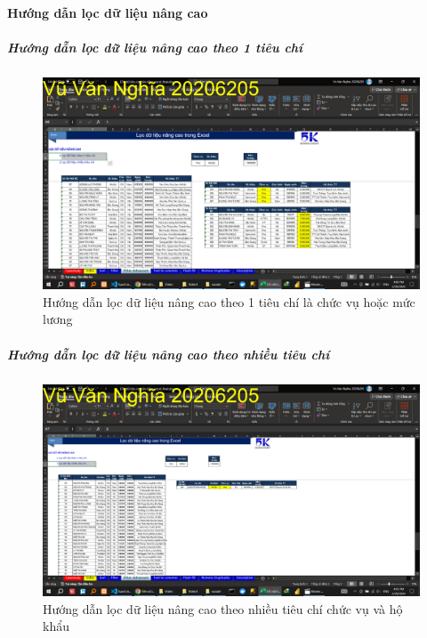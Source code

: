 \documentclass{article}
\begin{document}



\paragraph{Hướng dẫn lọc dữ liệu nâng cao}
\subparagraph{Hướng dẫn lọc dữ liệu nâng cao theo 1 tiêu chí}
\begin{figure}[h]
    \centering
    \includegraphics[scale = 0.15]{Video1/HuongDan/6.png}
    \caption{Hướng dẫn lọc dữ liệu nâng cao theo 1 tiêu chí là chức vụ hoặc mức lương}
\end{figure}
\subparagraph{Hướng dẫn lọc dữ liệu nâng cao theo nhiều tiêu chí}
\begin{figure}[h]
    \centering
    \includegraphics[scale = 0.15]{Video1/HuongDan/7.png}
    \caption{Hướng dẫn lọc dữ liệu nâng cao theo  nhiều tiêu chí  chức vụ và hộ khẩu}
\end{figure}
\end{document}
